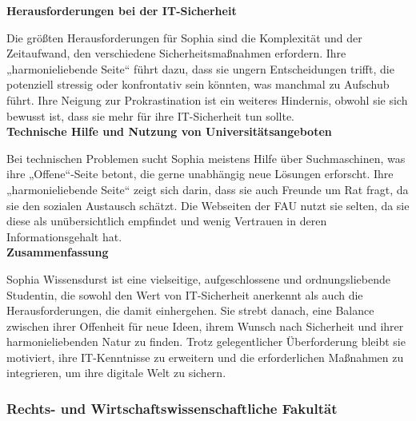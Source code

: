 \documentclass[german,report]{i1thesis}
\begin{document}
\textbf{Herausforderungen bei der IT-Sicherheit}

Die größten Herausforderungen für Sophia sind die Komplexität und der Zeitaufwand, den verschiedene Sicherheitsmaßnahmen erfordern. Ihre „harmonieliebende Seite“ führt dazu, dass sie ungern Entscheidungen trifft, die potenziell stressig oder konfrontativ sein könnten, was manchmal zu Aufschub führt. Ihre Neigung zur Prokrastination ist ein weiteres Hindernis, obwohl sie sich bewusst ist, dass sie mehr für ihre IT-Sicherheit tun sollte.\\

\textbf{Technische Hilfe und Nutzung von Universitätsangeboten}

Bei technischen Problemen sucht Sophia meistens Hilfe über Suchmaschinen, was ihre „Offene“-Seite betont, die gerne unabhängig neue Lösungen erforscht. Ihre „harmonieliebende Seite“ zeigt sich darin, dass sie auch Freunde um Rat fragt, da sie den sozialen Austausch schätzt. Die Webseiten der FAU nutzt sie selten, da sie diese als unübersichtlich empfindet und wenig Vertrauen in deren Informationsgehalt hat.\\

\textbf{Zusammenfassung}

Sophia Wissensdurst ist eine vielseitige, aufgeschlossene und ordnungsliebende Studentin, die sowohl den Wert von IT-Sicherheit anerkennt als auch die Herausforderungen, die damit einhergehen. Sie strebt danach, eine Balance zwischen ihrer Offenheit für neue Ideen, ihrem Wunsch nach Sicherheit und ihrer harmonieliebenden Natur zu finden. Trotz gelegentlicher Überforderung bleibt sie motiviert, ihre IT-Kenntnisse zu erweitern und die erforderlichen Maßnahmen zu integrieren, um ihre digitale Welt zu sichern.

\subsubsection{Rechts- und Wirtschaftswissenschaftliche Fakultät}
\end{document}
